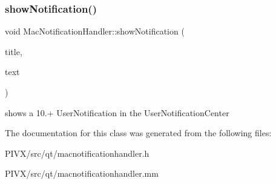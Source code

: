 \subsubsection{\texorpdfstring{show\+Notification()}{showNotification()}}
{\footnotesize\ttfamily void Mac\+Notification\+Handler\+::show\+Notification (\begin{DoxyParamCaption}\item[{const Q\+String \&}]{title,  }\item[{const Q\+String \&}]{text }\end{DoxyParamCaption})}

shows a 10.+ User\+Notification in the User\+Notification\+Center 

The documentation for this class was generated from the following files\+:\begin{DoxyCompactItemize}
\item 
P\+I\+V\+X/src/qt/macnotificationhandler.\+h\item 
P\+I\+V\+X/src/qt/macnotificationhandler.\+mm\end{DoxyCompactItemize}
